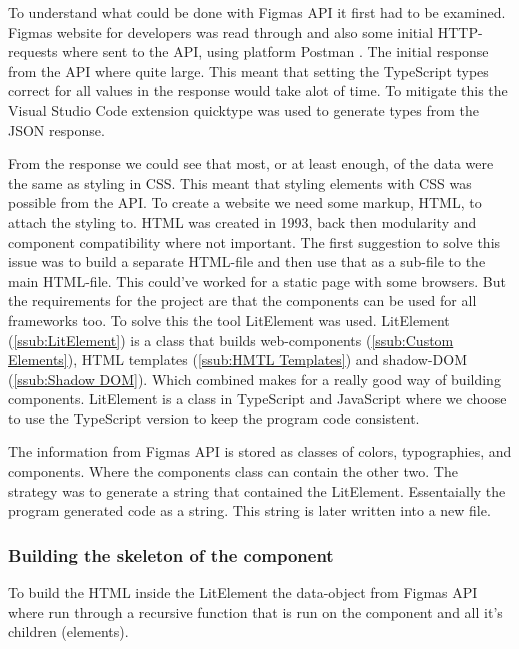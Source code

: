 To understand what could be done with Figmas API it first had to be examined. Figmas website for developers\cite{figmaFigma} was read through and also some initial HTTP-requests where sent to the API, using platform Postman \cite{PostmanCollaborationPlatform}. The initial response from the API where quite large. This meant that setting the TypeScript types correct for all values in the response would take alot of time. To mitigate this the Visual Studio Code \cite{VisualStudioCode} extension quicktype\cite{ConvertJSONSwift} was used to generate types from the JSON response. 

From the response we could see that most, or at least enough, of the data were the same as styling in CSS. This meant that styling elements with CSS was possible from the API. To create a website we need some markup, HTML, to attach the styling to. HTML was created in 1993, back then modularity and component compatibility where not important. The first suggestion to solve this issue was to build a separate HTML-file and then use that as a sub-file to the main HTML-file. This could've worked for a static page with some browsers. But the requirements for the project are that the components can be used for all frameworks too. To solve this the tool LitElement was used. LitElement (\ref{ssub:LitElement}) is a class that builds web-components (\ref{ssub:Custom Elements}), HTML templates (\ref{ssub:HMTL Templates}) and shadow-DOM (\ref{ssub:Shadow DOM}). Which combined makes for a really good way of building components. LitElement is a class in TypeScript and JavaScript where we choose to use the TypeScript version to keep the program code consistent. 

The information from Figmas API is stored as classes of colors, typographies, and components. Where the components class can contain the other two.  The strategy was to generate a string that contained the LitElement. Essentaially the program generated code as a string. This string is later written into a new file.

\subsubsection{Building the skeleton of the component}%
\label{ssub:building the skeleton of the component}
To build the HTML inside the LitElement the data-object from Figmas API where run through a recursive function that is run on the component and all it's children (elements).

